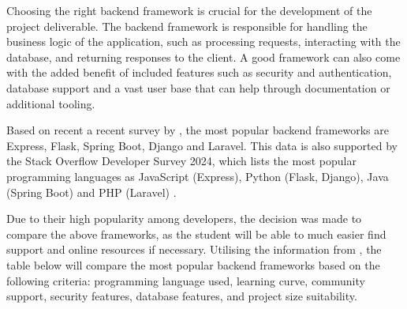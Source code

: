 Choosing the right backend framework is crucial for the development of the project deliverable. The backend framework is responsible for handling the business logic of the application, such as processing requests, interacting with the database, and returning responses to the client. A good framework can also come with the added benefit of included features such as security and authentication, database support and a vast user base that can help through documentation or additional tooling. 

Based on recent a recent survey by \textcite{statista-webframeworks}, the most popular backend frameworks are Express, Flask, Spring Boot, Django and Laravel. This data is also supported by the Stack Overflow Developer Survey 2024, which lists the most popular programming languages as JavaScript (Express), Python (Flask, Django), Java (Spring Boot) and PHP (Laravel) \parencite{stackoverflow}. 

Due to their high popularity among developers, the decision was made to compare the above frameworks, as the student will be able to much easier find support and online resources if necessary. Utilising the information from \textcite{spring,laravel,express,django}, the table below will compare the most popular backend frameworks based on the following criteria: programming language used, learning curve, community support, security features, database features, and project size suitability.

\begin{table}[h]
    \centering
    \caption{Comparison of backend frameworks}
    \label{tab:backend}
\end{table}

